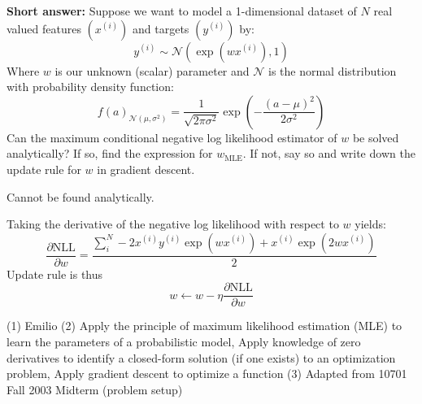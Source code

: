 \begin{questions}
    \question [] \textbf{Short answer:} Suppose we want to model a 1-dimensional dataset of $N$ real valued features $\left(x^{(i)}\right)$ and targets $\left(y^{(i)}\right)$ by:
    \[
        y^{(i)} \sim \mathcal{N}\left(\exp(wx^{(i)}), 1\right)
    \]
    Where $w$ is our unknown (scalar) parameter and $\mathcal{N}$ is the normal distribution with probability density function:
    \[
    f(a)_{\mathcal{N}(\mu, \sigma^2)} = \frac{1}{\sqrt{2\pi\sigma^2}}\exp\left(-\frac{(a - \mu)^2}{2\sigma^2}\right)
    \]
    Can the maximum conditional negative log likelihood estimator of $w$ be solved analytically? If so, find the expression for $w_\text{MLE}$. If not, say so and write down the update rule for $w$ in gradient descent.
    \fillwithlines{2em}
    \begin{soln}
    Cannot be found analytically. 
    
    Taking the derivative of the negative log likelihood with respect to $w$ yields:
    \[
    \frac{\partial \text{NLL}}{\partial w} = \frac{\sum_{i}^N -2x^{(i)}y^{(i)}\exp(wx^{(i)}) + x^{(i)}\exp(2wx^{(i)})}{2}
    \]
    Update rule is thus
    \[
    w \leftarrow w - \eta \frac{\partial \text{NLL}}{\partial w}
    \]
    \end{soln}
    \begin{qauthor}
    (1) Emilio (2) Apply the principle of maximum likelihood estimation (MLE) to learn the parameters of a probabilistic model, Apply knowledge of zero derivatives to identify a closed-form solution (if one exists) to an optimization problem, Apply gradient descent to optimize a function (3) Adapted from 10701 Fall 2003 Midterm (problem setup)
    \end{qauthor}

\end{questions}


